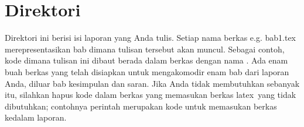 \section{Direktori }
\label{sec:bab-tex}
Direktori ini berisi isi laporan yang Anda tulis.
Setiap nama berkas e.g. bab1.tex merepresentasikan bab dimana tulisan tersebut akan muncul.
Sebagai contoh, kode dimana tulisan ini dibaut berada dalam berkas dengan nama .
Ada enam buah berkas yang telah disiapkan untuk mengakomodir enam bab dari laporan Anda, diluar bab kesimpulan dan saran.
Jika Anda tidak membutuhkan sebanyak itu, silahkan hapus kode dalam berkas  yang memasukan berkas \gls{latex}~yang tidak dibutuhkan;
contohnya perintah  merupakan kode untuk memasukan berkas  kedalam laporan.
